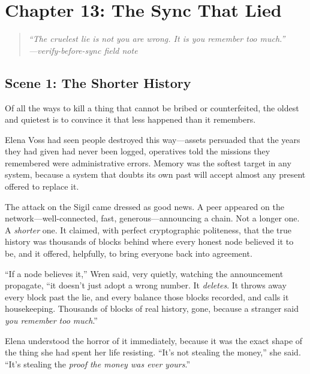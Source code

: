 \documentclass[12pt,letterpaper]{book}
\begin{document}
\hypertarget{chapter-13-the-sync-that-lied}{%
\section{Chapter 13: The Sync That
Lied}\label{chapter-13-the-sync-that-lied}}

\begin{quote}
\itshape ``The cruelest lie is not \emph{you are wrong}. It is \emph{you remember
too much}.''\\
\normalfont\hfill---verify-before-sync field note
\end{quote}

\hypertarget{scene-1-the-shorter-history}{%
\subsection{Scene 1: The Shorter
History}\label{scene-1-the-shorter-history}}

Of all the ways to kill a thing that cannot be bribed or counterfeited, the
oldest and quietest is to convince it that less happened than it remembers.

Elena Voss had seen people destroyed this way---assets persuaded that the years
they had given had never been logged, operatives told the missions they
remembered were administrative errors. Memory was the softest target in any
system, because a system that doubts its own past will accept almost any present
offered to replace it.

The attack on the Sigil came dressed as good news. A peer appeared on the
network---well-connected, fast, generous---announcing a chain. Not a longer one.
A \emph{shorter} one. It claimed, with perfect cryptographic politeness, that the
true history was thousands of blocks behind where every honest node believed it to
be, and it offered, helpfully, to bring everyone back into agreement.

``If a node believes it,'' Wren said, very quietly, watching the announcement
propagate, ``it doesn't just adopt a wrong number. It \emph{deletes}. It throws
away every block past the lie, and every balance those blocks recorded, and calls
it housekeeping. Thousands of blocks of real history, gone, because a stranger
said \emph{you remember too much}.''

Elena understood the horror of it immediately, because it was the exact shape of
the thing she had spent her life resisting. ``It's not stealing the money,'' she
said. ``It's stealing the \emph{proof the money was ever yours}.''
\end{document}

